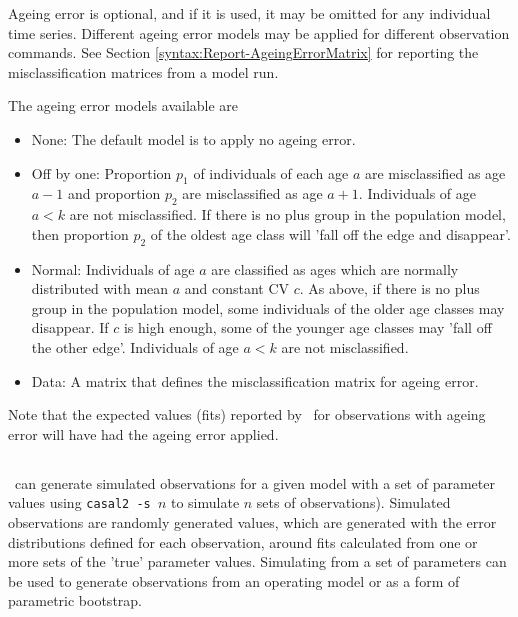 Ageing error is optional, and if it is used, it may be omitted for any individual time series. Different ageing error models may be applied for different observation commands. See Section \ref{syntax:Report-AgeingErrorMatrix} for reporting the misclassification matrices from a model run.

The ageing error models available are

\begin{itemize}
	\item{None}: The default model is to apply no ageing error.\label{sec:AgeingError-None}
	\item{Off by one}: Proportion $p_1$ of individuals of each age $a$ are misclassified as age $a-1$ and proportion $p_2$ are misclassified as age $a+1$. Individuals of age $a < k$ are not misclassified. If there is no plus group in the population model, then proportion $p_2$ of the oldest age class will 'fall off the edge and disappear'.\label{sec:AgeingError-OffByOne}
	\item{Normal}: Individuals of age $a$ are classified as ages which are normally distributed with mean $a$ and constant CV $c$. As above, if there is no plus group in the population model, some individuals of the older age classes may disappear. If $c$ is high enough, some of the younger age classes may 'fall off the other edge'. Individuals of age $a < k$ are not misclassified.\label{sec:AgeingError-Normal}
	\item{Data}: A matrix that defines the misclassification matrix for ageing error\label{sec:AgeingError-Data}.
\end{itemize}

Note that the expected values (fits) reported by \CNAME\ for observations with ageing error will have had the ageing error applied.
\fi

\subsection{}\label{sec:Simulate}

\CNAME\ can generate simulated observations for a given model with a set of parameter values using \texttt{casal2 -s $n$} to simulate $n$ sets of observations). Simulated observations are randomly generated values, which are generated with the error distributions defined for each observation, around fits calculated from one or more sets of the 'true' parameter values. Simulating from a set of parameters can be used to generate observations from an operating model or as a form of parametric bootstrap. 

